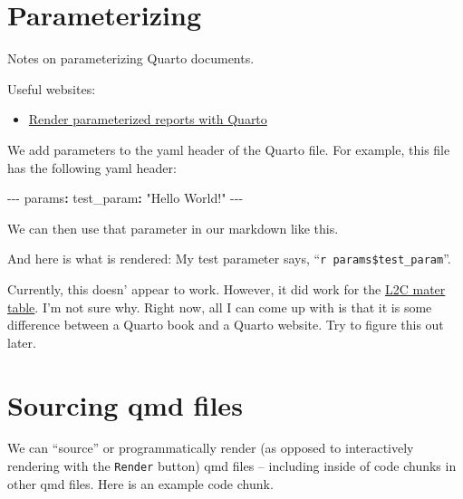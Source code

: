 \documentclass[
  letterpaper,
  DIV=11,
  numbers=noendperiod]{scrreprt}
\newenvironment{Shaded}{\begin{snugshade}}{\end{snugshade}}
\newcommand{\AttributeTok}[1]{\textcolor[rgb]{0.40,0.45,0.13}{#1}}
\newcommand{\FunctionTok}[1]{\textcolor[rgb]{0.28,0.35,0.67}{#1}}
\newcommand{\InformationTok}[1]{\textcolor[rgb]{0.37,0.37,0.37}{#1}}
\newcommand{\KeywordTok}[1]{\textcolor[rgb]{0.00,0.23,0.31}{\textbf{#1}}}
\newcommand{\NormalTok}[1]{\textcolor[rgb]{0.00,0.23,0.31}{#1}}
\newcommand{\PreprocessorTok}[1]{\textcolor[rgb]{0.68,0.00,0.00}{#1}}
\newcommand{\StringTok}[1]{\textcolor[rgb]{0.13,0.47,0.30}{#1}}
\providecommand{\tightlist}{%
  \setlength{\itemsep}{0pt}\setlength{\parskip}{0pt}}\usepackage{longtable,booktabs,array}
\begin{document}
\chapter{Parameterizing}\label{sec-parameterizing}

Notes on parameterizing Quarto documents.

Useful websites:

\begin{itemize}
\tightlist
\item
  \href{https://www.jhelvy.com/posts/2023-02-28-parameterized-pdfs-with-quarto/}{Render
  parameterized reports with Quarto}
\end{itemize}

We add parameters to the yaml header of the Quarto file. For example,
this file has the following yaml header:

\begin{Shaded}
\begin{Highlighting}[]
\PreprocessorTok{{-}{-}{-}}
\FunctionTok{params}\KeywordTok{:}
\AttributeTok{  }\FunctionTok{test\_param}\KeywordTok{:}\AttributeTok{ }\StringTok{"Hello World!"}
\PreprocessorTok{{-}{-}{-}}
\end{Highlighting}
\end{Shaded}

We can then use that parameter in our markdown like this.

\begin{Shaded}
\end{Shaded}

And here is what is rendered: My test parameter says,
``\texttt{r\ params\$test\_param}''.

Currently, this doesn' appear to work. However, it did work for the
\href{https://brad-cannell.github.io/l2c_master_table/}{L2C mater
table}. I'm not sure why. Right now, all I can come up with is that it
is some difference between a Quarto book and a Quarto website. Try to
figure this out later.

\chapter{Sourcing qmd files}\label{sec-sourcing-qmd-files}

We can ``source'' or programmatically render (as opposed to
interactively rendering with the \texttt{Render} button) qmd files --
including inside of code chunks in other qmd files. Here is an example
code chunk.
\end{document}
